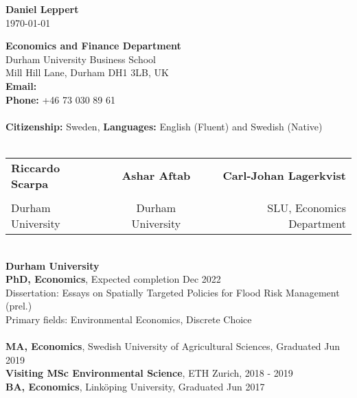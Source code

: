 \documentclass[12pt]{article}
\begin{document}
\setlength{\parindent}{0cm}
\begin{center}
{\bf \sc \LARGE Daniel Leppert} \\
\medskip 
\today
\end{center}
\bigskip

{\bf Economics and Finance Department} \\
Durham University Business School \\
Mill Hill Lane, Durham DH1 3LB, UK \\
{\bf Email:} \href{mailto:daniel.j.leppert@durham.ac.uk}{\color{violet}{daniel.j.leppert@durham.ac.uk}} \\
{\bf Phone:} +46 73 030 89 61 \\

{\color{violet}{\large \sc Personal Information}} \\ 
{\bf Citizenship:} Sweden, {\bf Languages:} English (Fluent) and Swedish (Native) \\
\\
{\color{violet}{\large \sc References}} 
\begin{table}[h]
\begin{tabular}{lcr}
{\bf Riccardo Scarpa} & {\bf Ashar Aftab} & {\bf Carl-Johan Lagerkvist} \\
\href{mailto:riccardo.scarpa@durham.ac.uk}{\color{violet}{riccardo.scarpa@durham.ac.uk}} & 
\href{mailto:ashar.aftab@durham.ac.uk}{\color{violet}{ashar.aftab@durham.ac.uk}} &
\href{mailto:carl-johan.lagerkvist@slu.se}{\color{violet}{carl-johan.lagerkvist@slu.se}} \\
Durham University & Durham University & SLU, Economics Department
\end{tabular}
\end{table}

{\color{violet}{\large \sc Doctoral Studies}} \\ 
{\bf Durham University} \\
{{\bf PhD, Economics}, Expected completion Dec 2022} \\
{\sc Dissertation:} Essays on Spatially Targeted Policies for Flood Risk Management (prel.) \\
{\sc Primary fields:} Environmental Economics, Discrete Choice \\

{\color{violet}{\large \sc Prior Education}} \\ 
{\bf MA, Economics}, Swedish University of Agricultural Sciences, Graduated Jun 2019 \\
{\bf Visiting MSc Environmental Science}, ETH Zurich, 2018 - 2019 \\
{\bf BA, Economics}, Linköping University, Graduated Jun 2017 \\
\end{document}
